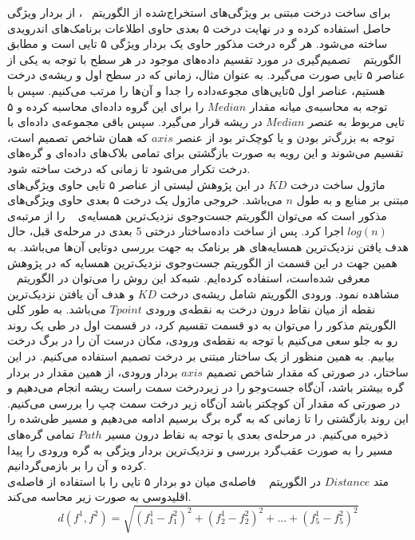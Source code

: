 برای ساخت درخت مبتنی بر ویژگی‌های استخراج‌شده از الگوریتم ~، از بردار ویژگی حاصل استفاده کرده و در نهایت درخت ۵ بعدی حاوی اطلاعات برنامک‌های اندرویدی ساخته می‌شود. هر گره درخت مذکور حاوی یک بردار ویژگی ۵ تایی است و مطابق الگوریتم ~ تصمیم‌گیری در مورد تقسیم داده‌های موجود در هر سطح با توجه به یکی از عناصر ۵ تایی صورت می‌گیرد. به عنوان مثال، زمانی که در سطح اول و ریشه‌ی درخت هستیم، عناصر اول ۵‌تایی‌های مجوعه‌داده را جدا و آن‌ها را مرتب می‌کنیم. سپس با توجه به محاسبه‌ی میانه مقدار $Median$ را برای این گروه داده‌ای محاسبه کرده و ۵ تایی مربوط به عنصر $Median$ در ریشه قرار می‌گیرد. سپس باقی مجموعه‌ی داده‌ای با توجه به بزرگ‌تر بودن و یا کوچک‌تر بود از عنصر  $axis$ که همان شاخص تصمیم است، تقسیم می‌شوند و این رویه به صورت بازگشتی برای تمامی بلاک‌های داده‌ای و گره‌های درخت تکرار می‌شود تا زمانی که درخت ساخته شود.\\
ماژول ساخت درخت $KD$ در این پژوهش لیستی از عناصر ۵ تایی حاوی ویژگی‌های مبتنی بر منابع و به طول $n$ می‌باشد. خروجی ماژول یک درخت ۵ بعدی حاوی ویژگی‌های مذکور است که می‌توان الگوریتم جست‌و‌جوی نزدیک‌ترین همسایه‌ی ~ را از مرتبه‌ی ${log(n)}$ اجرا کرد. 
پس از ساخت داده‌ساختار درختی 5 بعدی در مرحله‌ی قبل، حال هدف یافتن نزدیک‌ترین همسایه‌های هر برنامک به جهت بررسی دوتایی‌ آن‌ها می‌باشد. به همین جهت در این قسمت از الگوریتم جست‌و‌جوی نزدیک‌ترین همسایه که در پژوهش   معرفی شده‌است، استفاده کرده‌ایم. شبه‌کد این روش را می‌توان در الگوریتم ~ مشاهده نمود. ورودی الگوریتم شامل ریشه‌ی درخت $KD$ و هدف آن‌ یافتن نزدیک‌ترین نقطه از میان نقاط درون درخت به نقطه‌ی ورودی $Tpoint$ می‌باشد. به طور کلی الگوریتم مذکور را می‌توان به دو قسمت تقسیم کرد، در قسمت اول در طی یک روند رو به جلو سعی می‌کنیم با توجه به نقطه‌ی ورودی، مکان درست آن را در برگ درخت بیابیم. به همین منظور از یک ساختار مبتنی بر درخت تصمیم استفاده می‌کنیم. در این ساختار، در صورتی که  مقدار شاخص تصمیم $axis$ بردار ورودی، از همین مقدار در بردار گره بیشتر باشد، آن‌گاه جست‌و‌جو را در زیر‌درخت سمت راست ریشه انجام می‌دهیم و در صورتی که مقدار آن کوچکتر باشد آن‌گاه زیر درخت سمت چپ را بررسی می‌کنیم. این روند بازگشتی را تا زمانی که به گره برگ برسیم ادامه می‌دهیم و مسیر طی‌شده را ذخیره می‌کنیم. در مرحله‌ی بعدی با توجه به نقاط درون مسیر $Path$ تمامی گره‌های مسیر‌ را به صورت عقب‌گرد بررسی و نزدیک‌ترین بردار ویژگی به گره ورودی را پیدا کرده و آن را بر بازمی‌گردانیم.\\
متد $Distance$ در الگوریتم ~ فاصله‌ی میان دو بردار ۵ تایی را با استفاده از فاصله‌ی اقلیدوسی به صورت زیر محاسه می‌کند.
\begin{equation}
	d(f^1,f^2) = \sqrt{(f^1_{1}-f^2_{1})^2 + (f^1_{2}-f^2_{2})^2  + ... +(f^1_{5}-f^2_{5})^2  }
\end{equation}

